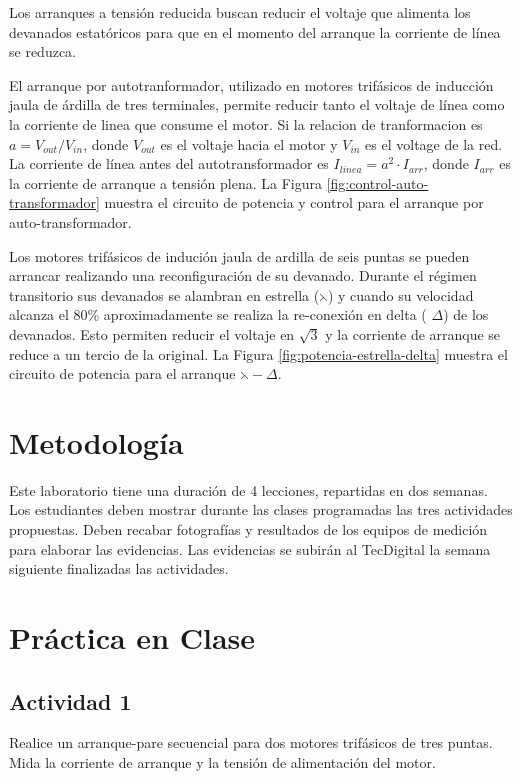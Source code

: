 Los arranques a tensión reducida buscan reducir el voltaje que alimenta los devanados estatóricos para que en el momento del arranque la corriente de línea se reduzca.


El arranque por autotranformador, utilizado en motores trifásicos de inducción jaula de árdilla de tres terminales, permite reducir tanto el voltaje de línea como 
la corriente de linea que consume el motor. Si la relacion de tranformacion es $a=V_{out}/V_{in}$, donde $V_{out}$ es el voltaje hacia el motor y $V_{in}$ es el voltage de la red. 
La corriente de línea antes del autotransformador es $I_{linea} = a^{2}\cdot I_{arr}$, donde $I_{arr}$ es la corriente de arranque a tensión plena. 
La Figura \ref{fig:control-auto-transformador} muestra el circuito de potencia y control para el arranque por auto-transformador.


Los motores trifásicos de indución jaula de ardilla de seis puntas se pueden arrancar realizando una reconfiguración de su devanado. Durante el régimen transitorio 
sus devanados se alambran en estrella ($\leftthreetimes$) y cuando su velocidad alcanza el 80\% aproximadamente se realiza la re-conexión en delta ( $\Delta$) de los devanados.
Esto permiten reducir el voltaje en $\sqrt{3}$ y la corriente de arranque se reduce a un tercio de la original. La Figura \ref{fig:potencia-estrella-delta} muestra el circuito
de potencia para el arranque $\leftthreetimes-\Delta$.

\section{Metodología}

Este laboratorio tiene una duración de 4 lecciones, repartidas en dos semanas. Los estudiantes deben mostrar durante las clases programadas las tres actividades propuestas. Deben recabar fotografías y resultados de los equipos de medición para elaborar las evidencias. Las evidencias se subirán al TecDigital la semana siguiente finalizadas las actividades.

\section{Práctica en Clase}

\subsection{Actividad 1}

Realice un arranque-pare secuencial para dos motores trifásicos de tres puntas. Mida la corriente de arranque y la tensión de alimentación del motor.

